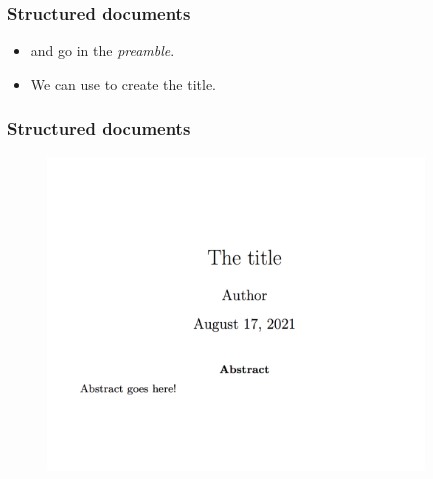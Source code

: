 \documentclass{beamer}
\def\openesc{\color{blue}}
\def\closeesc{\color{black}}
\def\vbdelim{\catcode`<=\active\catcode`>=\active%
\def<{\openesc}
\def>{\closeesc}}
\begin{document}
\begin{frame}[fragile]
\frametitle{Structured documents}
\begin{itemize}
\item \color{blue}{\verb|\title|} \color{black}and \color{blue}{\verb|\author|} \color{black} go in the \textit{preamble}.\\
\item We can use \color{blue}{\verb|\maketitle|} \color{black} to create the title. \\
\end{itemize}
\begin{framed}
\begin{minipage}[b]{0.4\textwidth}
\end{minipage}%
\end{framed}
\end{frame}

\begin{frame}[fragile]
\frametitle{Structured documents}
\begin{figure}
\includegraphics[width=100mm]{figures/example.png}
\end{figure}
\end{frame}
\end{document}
